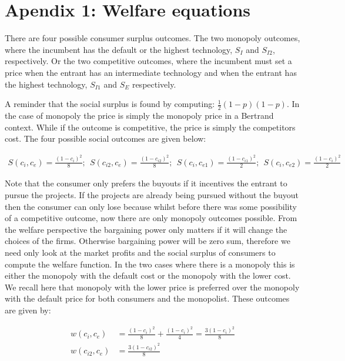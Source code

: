\newpage
\section*{Apendix 1: Welfare equations}

There are four possible consumer surplus outcomes. The two monopoly outcomes, where the incumbent has the default or the highest technology, $S_I$ and $S_{I2}$, respectively. Or the two competitive outcomes, where the incumbent must set a price when the entrant has an intermediate technology and when the entrant has the highest technology, $S_{I1}$ and $S_{E}$ respectively. 

A reminder that the social surplus is found by computing:
$\frac{1}{2}(1- p)(1-p)$. In the case of monopoly the price is simply the monopoly price in a Bertrand context. While if the outcome is competitive, the price is simply the competitors cost. The four possible  social outcomes are given below:

\begin{align*}
S(c_i, c_e) =  \frac{(1-c_i)^2}{8};  ~~
S(c_{i2}, c_e)=  \frac{(1-c_{i2})^2}{8}; ~~
S(c_{i}, c_{e1}) = \frac{(1-c_{i1})^2}{2};~~
S(c_{i}, c_{e2}) =  \frac{(1-c_i)^2}{2}
\end{align*}

Note that the consumer only prefers the buyouts if it incentives the entrant to pursue the projects. If the projects are already being pursued without the buyout then the consumer can only lose because whilst before there was some possibility of a competitive outcome, now there are only monopoly outcomes possible. From the welfare perspective the bargaining power only matters if it will change the choices of the firms. Otherwise bargaining power will be zero sum, therefore we need only look at the market profits and the social surplus of consumers to compute the welfare function. In the two cases where there is a monopoly this is either the monopoly with the default cost or the monopoly with the lower cost. We recall here that monopoly with the lower price is preferred over the monopoly with the default price for both consumers and the monopolist. These outcomes are given by:

\begin{align*}
w(c_{i}, c_{e}) &= \frac{(1-c_i)^2}{8} + \frac{(1-c_i)^2}{4}= \frac{3(1-c_i)^2}{8} \\
w(c_{i2}, c_{e}) &= \frac{3(1-c_{i2})^2}{8} \\
\end{align*}

